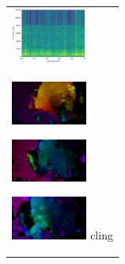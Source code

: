 \begin{enumerate}
\begin{end}
\begin{figure}[H]
\begin{tabular}{l}
\begin{minipage}{0.165\hsize}
\begin{center}
        \end{center}
      \end{minipage}
      \begin{minipage}{0.165\hsize}
        \begin{center}
          \includegraphics[clip, width=2.5cm]{./Figures/sound_sniffcling.eps}
        \end{center}
      \end{minipage}
\\  %
      \begin{minipage}{0.165\hsize}
        \begin{center}
          \includegraphics[clip, width=2.5cm]{./Figures/optic_sniffcling1.eps}
          \hspace{0.3cm} { }
        \end{center}
      \end{minipage}
      \begin{minipage}{0.165\hsize}
        \begin{center}
          \includegraphics[clip, width=2.5cm]{./Figures/optic_sniffcling2.eps}
          \hspace{0.0cm} { }
        \end{center}
      \end{minipage}
      \begin{minipage}{0.165\hsize}
        \begin{center}
          \includegraphics[clip, width=2.5cm]{./Figures/optic_sniffcling3.eps}
          \hspace{0.0cm} {cling}
        \end{center}
      \end{minipage}
      \begin{minipage}{0.165\hsize}

\end{minipage}
\end{tabular}
\end{figure}
\end{end}
\end{enumerate}
